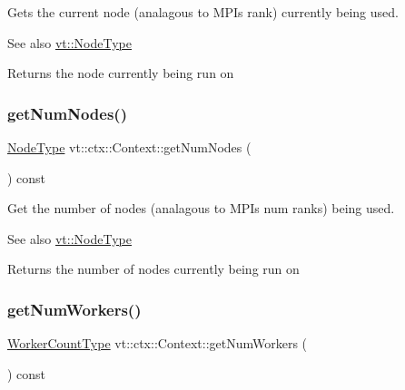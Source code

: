 Gets the current node (analagous to M\+PI\textquotesingle{}s rank) currently being used. 

\begin{DoxySeeAlso}{See also}
{\ttfamily \hyperlink{namespacevt_a866da9d0efc19c0a1ce79e9e492f47e2}{vt\+::\+Node\+Type}} 
\end{DoxySeeAlso}
\begin{DoxyReturn}{Returns}
the node currently being run on 
\end{DoxyReturn}
\mbox{\label{structvt_1_1ctx_1_1_context_a7f41071aadf6d5fa9e1b6c703c5ff19d}} 
\subsubsection{\texorpdfstring{get\+Num\+Nodes()}{getNumNodes()}}
{\footnotesize\ttfamily \hyperlink{namespacevt_a866da9d0efc19c0a1ce79e9e492f47e2}{Node\+Type} vt\+::ctx\+::\+Context\+::get\+Num\+Nodes (\begin{DoxyParamCaption}{ }\end{DoxyParamCaption}) const\hspace{0.3cm}{\ttfamily [inline]}}



Get the number of nodes (analagous to M\+PI\textquotesingle{}s num ranks) being used. 

\begin{DoxySeeAlso}{See also}
{\ttfamily \hyperlink{namespacevt_a866da9d0efc19c0a1ce79e9e492f47e2}{vt\+::\+Node\+Type}} 
\end{DoxySeeAlso}
\begin{DoxyReturn}{Returns}
the number of nodes currently being run on 
\end{DoxyReturn}
\mbox{\label{structvt_1_1ctx_1_1_context_a0ea881fa8c4d8fee74e85d8a6c52a6f0}} 
\subsubsection{\texorpdfstring{get\+Num\+Workers()}{getNumWorkers()}}
{\footnotesize\ttfamily \hyperlink{namespacevt_aa93398ea48f2cb6c188512250f7cc248}{Worker\+Count\+Type} vt\+::ctx\+::\+Context\+::get\+Num\+Workers (\begin{DoxyParamCaption}{ }\end{DoxyParamCaption}) const\hspace{0.3cm}{\ttfamily [inline]}}



